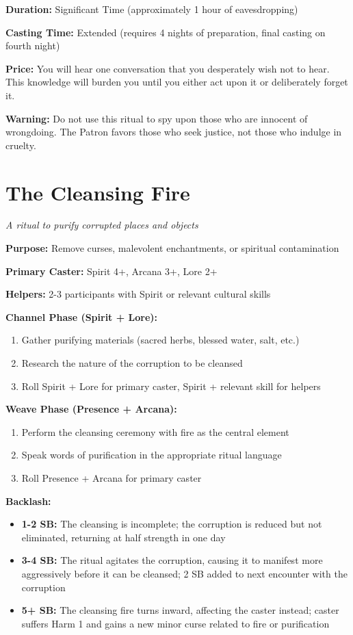 \textbf{Duration:} Significant Time (approximately 1 hour of eavesdropping)

\textbf{Casting Time:} Extended (requires 4 nights of preparation, final casting on fourth night)

\textbf{Price:} You will hear one conversation that you desperately wish not to hear. This knowledge will burden you until you either act upon it or deliberately forget it.

\textbf{Warning:} Do not use this ritual to spy upon those who are innocent of wrongdoing. The Patron favors those who seek justice, not those who indulge in cruelty.

\section*{The Cleansing Fire}
\textit{A ritual to purify corrupted places and objects}

\textbf{Purpose:} Remove curses, malevolent enchantments, or spiritual contamination

\textbf{Primary Caster:} Spirit 4+, Arcana 3+, Lore 2+

\textbf{Helpers:} 2-3 participants with Spirit or relevant cultural skills

\textbf{Channel Phase (Spirit + Lore):}
\begin{enumerate}
\item Gather purifying materials (sacred herbs, blessed water, salt, etc.)
\item Research the nature of the corruption to be cleansed
\item Roll Spirit + Lore for primary caster, Spirit + relevant skill for helpers
\end{enumerate}

\textbf{Weave Phase (Presence + Arcana):}
\begin{enumerate}
\item Perform the cleansing ceremony with fire as the central element
\item Speak words of purification in the appropriate ritual language
\item Roll Presence + Arcana for primary caster
\end{enumerate}

\textbf{Backlash:}
\begin{itemize}
\item \textbf{1-2 SB:} The cleansing is incomplete; the corruption is reduced but not eliminated, returning at half strength in one day
\item \textbf{3-4 SB:} The ritual agitates the corruption, causing it to manifest more aggressively before it can be cleansed; 2 SB added to next encounter with the corruption
\item \textbf{5+ SB:} The cleansing fire turns inward, affecting the caster instead; caster suffers Harm 1 and gains a new minor curse related to fire or purification
\end{itemize}

